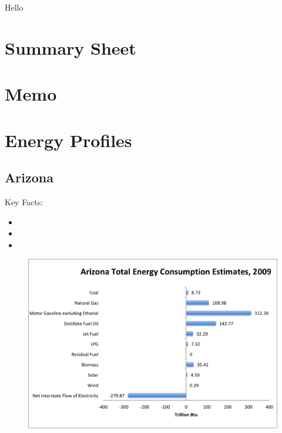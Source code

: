 \documentclass[12pt]{article}
\begin{document}
\begin{titlepage}
\begin{center}
\Large Hello
\end{center}
\end{titlepage}

\tableofcontents
\thispagestyle{empty}
\clearpage

\setcounter{page}{1}

\section*{Summary Sheet}

\newpage

\section*{Memo}

\newpage

\section{Energy Profiles}

\newpage

\subsection{Arizona}

\Large Key Facts:

\normalsize

\begin{itemize}

\item

\item

\item

\end{itemize}

\begin{figure}[!b]
    \centering
    \includegraphics[width=\linewidth]{ArizonaQuickGraph}
\end{figure}
\end{document}
